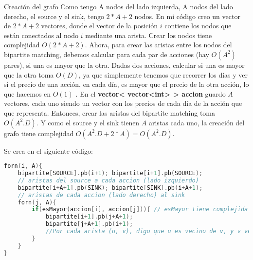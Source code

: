 \documentclass[a4paper]{article}
\begin{document}
\begin{subsubsection}{Creación del grafo} 
Como tengo A nodos del lado izquierda, A nodos del lado derecho, el source y el sink, tengo $2*A+2$ nodos.
En mi código creo un vector de $2*A+2$ vectores, donde el vector de la posición $i$ contiene los nodos que están conectados al nodo $i$ mediante una arista.
Crear los nodos tiene complejidad $O(2*A+2)$.
Ahora, para crear las aristas entre los nodos del bipartite matching, debemos calcular para cada par de acciones (hay $O(A^2)$ pares), si una es mayor que la otra. Dadas dos acciones, calcular si una es mayor que la otra toma $O(D)$, ya que simplemente tenemos que recorrer los días y ver si el precio de una acción, en cada día, es mayor que el precio de la otra acción, lo que hacemos en $O(1)$ . En el \textbf{vector< vector<int> > accion} guardo $A$ vectores, cada uno siendo un vector con los precios de cada día de la acción que que representa.
Entonces, crear las aristas del bipartite matching toma $O(A^2.D)$.
Y como el source y el sink tienen $A$ aristas cada uno, la creación del grafo tiene complejidad $O(A^2.D + 2*A) = O(A^2.D)$.

Se crea en el siguiente código:
\begin{lstlisting}[language=c++]
forn(i, A){
	bipartite[SOURCE].pb(i+1); bipartite[i+1].pb(SOURCE);
    // aristas del source a cada accion (lado izquierdo)
	bipartite[i+A+1].pb(SINK); bipartite[SINK].pb(i+A+1);
    // aristas de cada accion (lado derecho) al sink
	forn(j, A){
		if(esMayor(accion[i], accion[j])){ // esMayor tiene complejida O(D)
			bipartite[i+1].pb(j+A+1);
			bipartite[j+A+1].pb(i+1);
            //Por cada arista (u, v), digo que u es vecino de v, y v vecino de u
		}
	}
}

\end{lstlisting}

\end{subsubsection}
\end{document}
